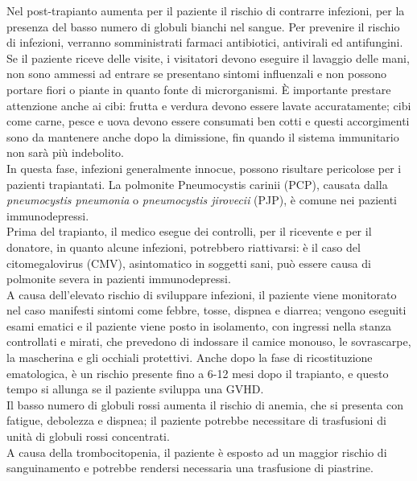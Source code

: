 Nel post-trapianto aumenta per il paziente il rischio di contrarre infezioni, per la presenza del basso numero 
di globuli bianchi nel sangue. Per prevenire il rischio di infezioni, verranno somministrati farmaci antibiotici, 
antivirali ed antifungini.\\ Se il paziente riceve delle visite, i visitatori devono eseguire il lavaggio delle mani, 
non sono ammessi ad entrare se presentano sintomi influenzali e non possono portare fiori o piante in quanto 
fonte di microrganismi. È importante prestare attenzione anche ai cibi: frutta e verdura devono essere 
lavate accuratamente; cibi come carne, pesce e uova devono essere consumati ben cotti e questi accorgimenti 
sono da mantenere anche dopo la dimissione, fin quando il sistema immunitario non sarà più indebolito\cite{LLSBLOOD}.\\
In questa fase, infezioni generalmente innocue, possono risultare pericolose per i pazienti trapiantati. 
La polmonite Pneumocystis carinii (PCP), causata dalla \emph{pneumocystis pneumonia} o \emph{pneumocystis jirovecii} (PJP), 
è comune nei pazienti immunodepressi.\\
Prima del trapianto, il medico esegue dei controlli, per il ricevente e per il donatore, in quanto alcune 
infezioni, potrebbero riattivarsi: è il caso del citomegalovirus (CMV), asintomatico in soggetti sani, 
può essere causa di polmonite severa in pazienti immunodepressi\cite{STEMCELLS}.\\
A causa dell’elevato rischio di sviluppare infezioni, il paziente viene monitorato nel caso manifesti sintomi come 
febbre, tosse, dispnea e diarrea; vengono eseguiti esami ematici e il paziente viene posto in isolamento, con 
ingressi nella stanza controllati e mirati, che prevedono di indossare il camice monouso, le sovrascarpe, 
la mascherina e gli occhiali protettivi.
Anche dopo la fase di ricostituzione ematologica, è un rischio presente fino a 6-12 mesi dopo il trapianto, e questo 
tempo si allunga se il paziente sviluppa una GVHD\cite{STEMCELLS}.\\

Il basso numero di globuli rossi aumenta il rischio di anemia, che si presenta con fatigue, debolezza e dispnea; 
il paziente potrebbe necessitare di trasfusioni di unità di globuli rossi concentrati\cite{LLSBLOOD}.\\
A causa della trombocitopenia, il paziente è esposto ad un maggior rischio di sanguinamento e potrebbe 
rendersi necessaria una trasfusione di piastrine\cite{LLSBLOOD}.\\

